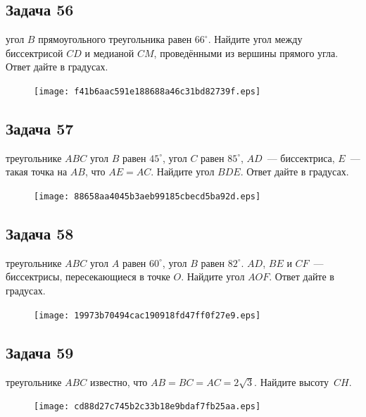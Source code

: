 \documentclass[a4paper,10pt]{article} %
\begin{document}
\begin{spacing}{1.0}
{\subsection*{Задача 56}
 угол $B$ прямоугольного треугольника равен $66^\circ$. Найдите угол между биссектрисой $CD$ и медианой $CM$, проведёнными из вершины прямого угла. Ответ дайте в градусах.

\vspace{1.5cm}

\begin{figure}{\texttt{[image: f41b6aac591e188688a46c31bd82739f.eps]}}\end{figure}
\subsection*{Задача 57}
 треугольнике $ABC$ угол $B$ равен $45^\circ$, угол $C$ равен $85^\circ$, $AD$~--- биссектриса, $E$~--- такая точка на $AB$, что $AE = AC$. Найдите угол $BDE$. Ответ дайте в градусах.

\vspace{2cm}

\begin{figure}{\texttt{[image: 88658aa4045b3aeb99185cbecd5ba92d.eps]}}\end{figure}
\subsection*{Задача 58}
 треугольнике $ABC$ угол $A$ равен $60^\circ$, угол $B$ равен $82^\circ$. $AD$, $BE$ и $CF$~--- биссектрисы, пересекающиеся в точке $O$. Найдите угол $AOF$. Ответ дайте в градусах.

\vspace{1.5cm}

\begin{figure}{\texttt{[image: 19973b70494cac190918fd47ff0f27e9.eps]}}\end{figure}
\subsection*{Задача 59}
 треугольнике $ABC$ известно, что \linebreak${AB=BC=AC=2\sqrt{3}}$. Найдите {высоту~$CH$}. 

\vspace{1.5cm}

\begin{figure}{\texttt{[image: cd88d27c745b2c33b18e9bdaf7fb25aa.eps]}}\end{figure}
}
\end{spacing}
\end{document}
